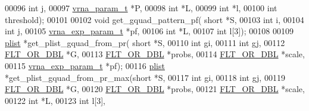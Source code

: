 \begin{DoxyCode}
00096                               \textcolor{keywordtype}{int} j,
00097                               \hyperlink{group__energy__parameters_structvrna__param__s}{vrna\_param\_t} *P,
00098                               \textcolor{keywordtype}{int} *L,
00099                               \textcolor{keywordtype}{int} *l,
00100                               \textcolor{keywordtype}{int} threshold);
00101 
00102 \textcolor{keywordtype}{void}        get\_gquad\_pattern\_pf( \textcolor{keywordtype}{short} *S,
00103                                   \textcolor{keywordtype}{int} i,
00104                                   \textcolor{keywordtype}{int} j,
00105                                   \hyperlink{group__energy__parameters_structvrna__exp__param__s}{vrna\_exp\_param\_t} *pf,
00106                                   \textcolor{keywordtype}{int} *L,
00107                                   \textcolor{keywordtype}{int} l[3]);
00108 
00109 \hyperlink{group__data__structures_structvrna__plist__s}{plist}       *get\_plist\_gquad\_from\_pr( \textcolor{keywordtype}{short} *S,
00110                                       \textcolor{keywordtype}{int} gi,
00111                                       \textcolor{keywordtype}{int} gj,
00112                                       \hyperlink{group__data__structures_ga31125aeace516926bf7f251f759b6126}{FLT\_OR\_DBL} *G,
00113                                       \hyperlink{group__data__structures_ga31125aeace516926bf7f251f759b6126}{FLT\_OR\_DBL} *probs,
00114                                       \hyperlink{group__data__structures_ga31125aeace516926bf7f251f759b6126}{FLT\_OR\_DBL} *scale,
00115                                       \hyperlink{group__energy__parameters_structvrna__exp__param__s}{vrna\_exp\_param\_t} *pf);
00116 \hyperlink{group__data__structures_structvrna__plist__s}{plist}       *get\_plist\_gquad\_from\_pr\_max(\textcolor{keywordtype}{short} *S,
00117                                       \textcolor{keywordtype}{int} gi,
00118                                       \textcolor{keywordtype}{int} gj,
00119                                       \hyperlink{group__data__structures_ga31125aeace516926bf7f251f759b6126}{FLT\_OR\_DBL} *G,
00120                                       \hyperlink{group__data__structures_ga31125aeace516926bf7f251f759b6126}{FLT\_OR\_DBL} *probs,
00121                                       \hyperlink{group__data__structures_ga31125aeace516926bf7f251f759b6126}{FLT\_OR\_DBL} *scale,
00122                                       \textcolor{keywordtype}{int} *L,
00123                                       \textcolor{keywordtype}{int} l[3],

\end{DoxyCode}
